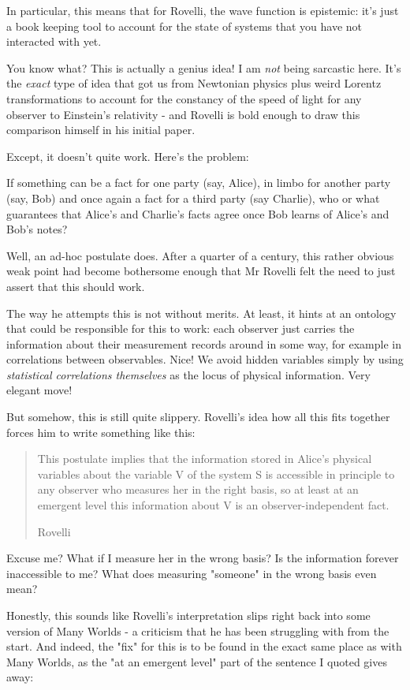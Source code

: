 \documentclass{article}
\begin{document}
In particular, this means that for Rovelli, the wave function is epistemic: it's just a book keeping tool to account for the state of systems that you have not interacted with yet.

You know what? This is actually a genius idea! I am \textit{not} being sarcastic here. It's the \textit{exact} type of idea that got us from Newtonian physics plus weird Lorentz transformations to account for the constancy of the speed of light for any observer to Einstein's relativity - and Rovelli is bold enough to draw this comparison himself in his initial paper.

Except, it doesn't quite work. Here's the problem:

If something can be a fact for one party (say, Alice), in limbo for another party (say, Bob) and once again a fact for a third party (say Charlie), who or what guarantees that Alice's and Charlie's facts agree once Bob learns of Alice's and Bob's notes?

Well, an ad-hoc postulate does. After a quarter of a century, this rather obvious weak point had become bothersome enough that Mr Rovelli felt the need to just assert \cite{pittphilsci20469} that this should work.

The way he attempts this is not without merits. At least, it hints at an ontology that could be responsible for this to work: each observer just carries the information about their measurement records around in some way, for example in correlations between observables. Nice! We avoid hidden variables simply by using \textit{statistical correlations themselves} as the locus of physical information. Very elegant move!

But somehow, this is still quite slippery. Rovelli's idea how all this fits together forces him to write something like this:

\blockquote[Rovelli]{
This postulate implies that the information stored in Alice’s physical variables about the variable V of the system S is accessible in principle to any observer who measures her in the right basis, so at least at an emergent level this information about V is an observer-independent fact.
}

Excuse me? What if I measure her in the wrong basis? Is the information forever inaccessible to me? What does measuring "someone" in the wrong basis even mean?

Honestly, this sounds like Rovelli's interpretation slips right back into some version of Many Worlds - a criticism that he has been struggling with from the start. And indeed, the "fix" for this is to be found in the exact same place as with Many Worlds, as the "at an emergent level" part of the sentence I quoted gives away:
\end{document}
